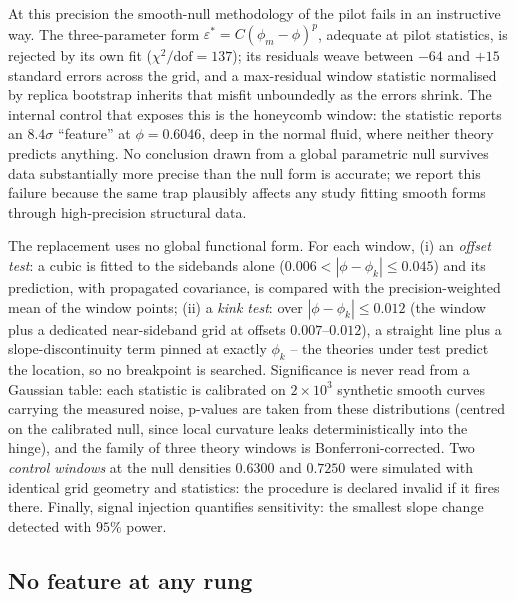 \documentclass[aps,prl,twocolumn,superscriptaddress,floatfix]{revtex4-2}
\begin{document}
At this precision the smooth-null methodology of the pilot fails in an
instructive way. The three-parameter form
$\varepsilon^*=C(\phi_m-\phi)^p$, adequate at pilot statistics, is rejected
by its own fit ($\chi^2/\mathrm{dof}=137$); its residuals weave between
$-64$ and $+15$ standard errors across the grid, and a max-residual window
statistic normalised by replica bootstrap inherits that misfit unboundedly
as the errors shrink. The internal control that exposes this is the
honeycomb window: the statistic reports an $8.4\sigma$ ``feature'' at
$\phi=0.6046$, deep in the normal fluid, where neither theory predicts
anything. No conclusion drawn from a global parametric null survives data
substantially more precise than the null form is accurate; we report this
failure because the same trap plausibly affects any study fitting smooth
forms through high-precision structural data.

The replacement uses no global functional form. For each window, (i) an
\emph{offset test}: a cubic is fitted to the sidebands alone
($0.006<|\phi-\phi_k|\leq0.045$) and its prediction, with propagated
covariance, is compared with the precision-weighted mean of the window
points; (ii) a \emph{kink test}: over $|\phi-\phi_k|\leq0.012$ (the window
plus a dedicated near-sideband grid at offsets $0.007$--$0.012$), a straight
line plus a slope-discontinuity term pinned at exactly $\phi_k$ -- the
theories under test predict the location, so no breakpoint is searched.
Significance is never read from a Gaussian table: each statistic is
calibrated on $2\times10^3$ synthetic smooth curves carrying the measured
noise, p-values are taken from these distributions (centred on the
calibrated null, since local curvature leaks deterministically into the
hinge), and the family of three theory windows is Bonferroni-corrected.
Two \emph{control windows} at the null densities $0.6300$ and $0.7250$ were
simulated with identical grid geometry and statistics: the procedure is
declared invalid if it fires there. Finally, signal injection quantifies
sensitivity: the smallest slope change detected with $95\%$ power.

\subsection{No feature at any rung}
\end{document}
